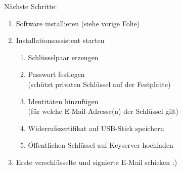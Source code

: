 \begin{frame}{Nächste Schritte:}
  \begin{enumerate}
    \item Software installieren (siehe vorige Folie)
    \item Installationsassistent starten
    \begin{enumerate}
      \item Schlüsselpaar erzeugen
      \item Passwort festlegen\\ (schützt privaten Schlüssel auf der Festplatte)
      \item Identitäten hinzufügen\\ (für welche E-Mail-Adresse(n) der Schlüssel gilt)
      \item Widerrufszertifikat auf USB-Stick speichern
      \item Öffentlichen Schlüssel auf Keyserver hochladen
    \end{enumerate}
    \item Erste verschlüsselte und signierte E-Mail schicken :)
  \end{enumerate}
\end{frame}

\endinput
